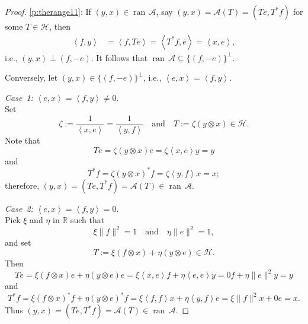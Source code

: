 \documentclass[12pt]{article}
\newcommand{\nnn}{\ensuremath{{n\in{\mathbb N}}}}
\newcommand{\scal}[2]{\left\langle{#1},{#2}  \right\rangle}
\newcommand{\RR}{\ensuremath{\mathbb R}}
\newcommand{\ran}{\ensuremath{{\operatorname{ran}}\,}}
\theoremstyle{definition}
\providecommand{\RR}{\mathbb{R}}
\providecommand{\ran}{\operatorname{ran}}
\providecommand{\ran}{\operatorname{ran}}
\providecommand{\RR}{\mathbb{R}}
\providecommand{\mA}{\mathcal{A}}
\providecommand{\mH}{\mathcal{H}}
\begin{document}
{\begin{proof}
\cref{p:therange11}: 
If $(y,x)\in\ran\mA$, say
$(y,x)=\mathcal{A}(T)=(Te,T^*f)$ for some $T\in\mH$, 
then
\begin{align}
\scal{f}{y}
&=\scal{f}{Te}
= \scal{T^*f}{e}
=\scal{x}{e},
\end{align}
i.e., $(y,x)\perp (f,-e)$.
It follows that $\ran\mA\subseteq \{(f,-e)\}^\perp$.

Conversely, let $(y,x)\in\{(f,-e)\}^\perp$, i.e., 
$\scal{e}{x}=\scal{f}{y}$.

{\it Case~1:} $\scal{e}{x}=\scal{f}{y}\neq 0$.\\
Set
\begin{equation}
\zeta := \frac{1}{\scal{x}{e}}=\frac{1}{\scal{y}{f}} 
\quad\text{and}\quad
T := \zeta (y\otimes x)\in\mH.
\end{equation}
Note that 
\begin{equation}
Te = \zeta(y\otimes x)e
= \zeta \scal{x}{e}y = y
\end{equation}
and 
\begin{equation}
T^*f = \zeta (y\otimes  x)^*f
= \zeta\scal{y}{f}x = x;
\end{equation}
therefore, $(y,x)=(Te,T^*f)=\mA(T)\in\ran \mA$.

{\it Case~2:} $\scal{e}{x}=\scal{f}{y}=0$.\\
Pick $\xi$ and $\eta$ in $\RR$ such that 
\begin{equation}
\xi \|f\|^2=1
\quad\text{and}\quad 
\eta\|e\|^2=1,
\end{equation}
and set 
\begin{equation}
T := \xi(f\otimes x) + \eta(y\otimes e)\in\mH.
\end{equation}
Then
\begin{equation}
Te = \xi(f\otimes x)e + \eta(y\otimes e)e
= \xi\scal{x}{e}f + \eta\scal{e}{e}y = 0f + \eta\|e\|^2y = y
\end{equation}
and 
\begin{equation}
T^*f = \xi(f\otimes x)^*f + \eta(y\otimes e)^*f
= \xi\scal{f}{f}x + \eta\scal{y}{f}e = \xi\|f\|^2x + 0e = x.
\end{equation}
Thus 
$(y,x)=(Te,T^*f)=\mA(T)\in\ran\mA$. 
\end{proof}









}
\end{document}
